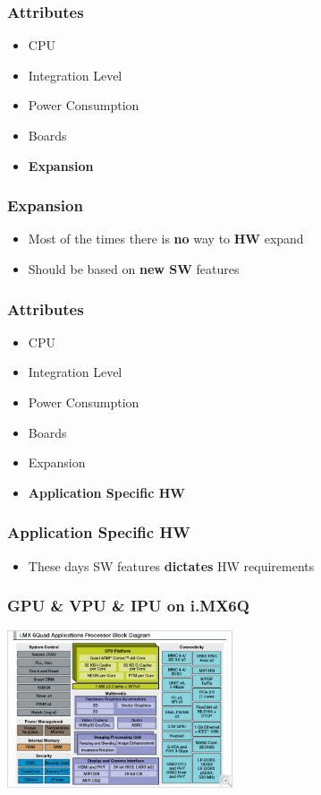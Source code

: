\begin{frame}
  \frametitle{Attributes}
  \begin{itemize}
    \item CPU
    \item Integration Level
    \item Power Consumption
    \item Boards
    \item {\bf Expansion}
  \end{itemize}
\end{frame}

\begin{frame}
  \frametitle{Expansion}
  \begin{itemize}
    \item Most of the times there is {\bf no} way to {\bf HW} expand
    \item Should be based on {\bf new SW} features
  \end{itemize}
\end{frame}

\begin{frame}
  \frametitle{Attributes}
  \begin{itemize}
    \item CPU
    \item Integration Level
    \item Power Consumption
    \item Boards
    \item Expansion
    \item {\bf Application Specific HW}
  \end{itemize}
\end{frame}
\begin{frame}

\frametitle{Application Specific HW}
  \begin{itemize}
    \item These days SW features {\bf dictates} HW requirements
  \end{itemize}
\end{frame}

\begin{frame}
  \frametitle{GPU \& VPU \& IPU on i.MX6Q}
  \begin{center}
    \includegraphics[width=0.5\textwidth]{slides/te5009-embedded-systems-attributes/IMX6Q_BD_TN.jpg}
  \end{center}
\end{frame}

